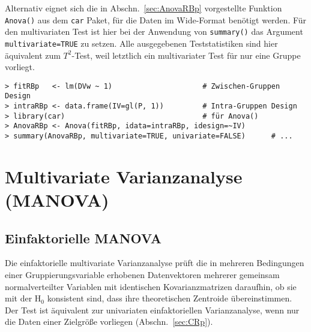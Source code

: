 Alternativ eignet sich die in Abschn.\ \ref{sec:AnovaRBp} vorgestellte Funktion \lstinline!Anova()! aus dem \lstinline!car! Paket, für die Daten im Wide-Format benötigt werden. Für den multivariaten Test ist hier bei der Anwendung von \lstinline!summary()! das Argument \lstinline!multivariate=TRUE! zu setzen. Alle ausgegebenen Teststatistiken sind hier äquivalent zum $T^{2}$-Test, weil letztlich ein multivariater Test für nur eine Gruppe vorliegt.
\begin{lstlisting}
> fitRBp   <- lm(DVw ~ 1)                     # Zwischen-Gruppen Design
> intraRBp <- data.frame(IV=gl(P, 1))         # Intra-Gruppen Design
> library(car)                                # für Anova()
> AnovaRBp <- Anova(fitRBp, idata=intraRBp, idesign=~IV)
> summary(AnovaRBp, multivariate=TRUE, univariate=FALSE)      # ...
\end{lstlisting}

\section{Multivariate Varianzanalyse (MANOVA)}
\label{sec:multManova}

\subsection{Einfaktorielle MANOVA}
\label{sec:multManova1}

Die einfaktorielle multivariate Varianzanalyse prüft die in mehreren Bedingungen einer Gruppierungsvariable erhobenen Datenvektoren mehrerer gemeinsam normalverteilter Variablen mit identischen Kovarianzmatrizen daraufhin, ob sie mit der $\text{H}_{0}$ konsistent sind, dass ihre theoretischen Zentroide übereinstimmen. Der Test ist äquivalent zur univariaten einfaktoriellen Varianzanalyse, wenn nur die Daten einer Zielgröße vorliegen (Abschn.\ \ref{sec:CRp}).

